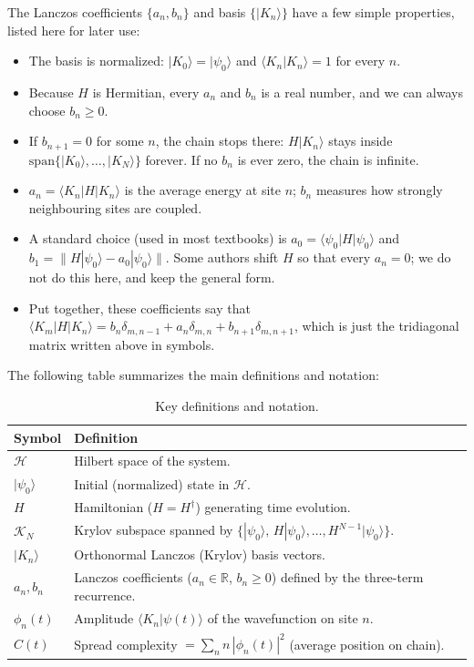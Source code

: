 \documentclass[11pt]{article}
\begin{document}
The Lanczos coefficients $\{a_n,b_n\}$ and basis $\{|K_n\rangle\}$ have a few simple properties, listed here for later use:
\begin{itemize}
\item The basis is normalized: $|K_0\rangle=|\psi_0\rangle$ and $\langle K_n|K_n\rangle=1$ for every $n$.
\item Because $H$ is Hermitian, every $a_n$ and $b_n$ is a real number, and we can always choose $b_n\ge0$.
\item If $b_{n+1}=0$ for some $n$, the chain stops there: $H|K_n\rangle$ stays inside $\mathrm{span}\{|K_0\rangle,\dots,|K_N\rangle\}$ forever. If no $b_n$ is ever zero, the chain is infinite.
\item $a_n=\langle K_n|H|K_n\rangle$ is the average energy at site $n$; $b_n$ measures how strongly neighbouring sites are coupled.
\item A standard choice (used in most textbooks) is $a_0=\langle\psi_0|H|\psi_0\rangle$ and $b_1=\|H|\psi_0\rangle - a_0|\psi_0\rangle\|$. Some authors shift $H$ so that every $a_n=0$; we do not do this here, and keep the general form.
\item Put together, these coefficients say that $\langle K_m|H|K_n\rangle = b_n\delta_{m,n-1}+a_n\delta_{m,n}+b_{n+1}\delta_{m,n+1}$, which is just the tridiagonal matrix written above in symbols.
\end{itemize}

The following table summarizes the main definitions and notation:

\begin{table}[h]
\centering
\begin{tabular}{ll}
\hline
Symbol & Definition \\
\hline
$\mathcal{H}$ & Hilbert space of the system. \\
$|\psi_0\rangle$ & Initial (normalized) state in $\mathcal{H}$. \\
$H$ & Hamiltonian ($H=H^\dagger$) generating time evolution. \\
$\mathcal{K}_N$ & Krylov subspace spanned by $\{|\psi_0\rangle,\,H|\psi_0\rangle,\dots,H^{N-1}|\psi_0\rangle\}$. \\
$|K_n\rangle$ & Orthonormal Lanczos (Krylov) basis vectors. \\
$a_n,b_n$ & Lanczos coefficients ($a_n\in\mathbb{R}$, $b_n\ge0$) defined by the three-term recurrence. \\
$\phi_n(t)$ & Amplitude $\langle K_n|\psi(t)\rangle$ of the wavefunction on site $n$. \\
$C(t)$ & Spread complexity $= \sum_n n\,|\phi_n(t)|^2$ (average position on chain). \\
\hline
\end{tabular}
\caption{Key definitions and notation.}
\label{tab:notation}
\end{table}
\end{document}
